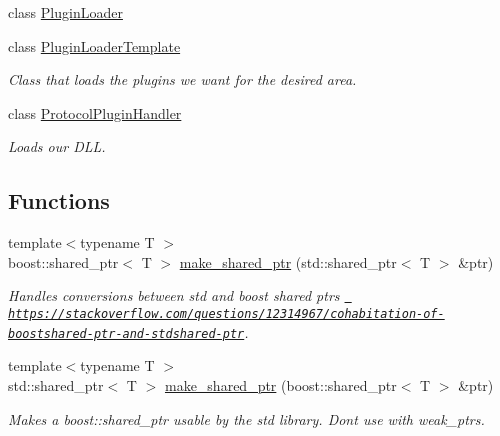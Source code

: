 \begin{DoxyCompactItemize}
class \mbox{\hyperlink{classPluginLoader_1_1PluginLoader}{Plugin\+Loader}}
\item 
class \mbox{\hyperlink{classPluginLoader_1_1PluginLoaderTemplate}{Plugin\+Loader\+Template}}
\begin{DoxyCompactList}\small\item\em Class that loads the plugins we want for the desired area. \end{DoxyCompactList}\item 
class \mbox{\hyperlink{classPluginLoader_1_1ProtocolPluginHandler}{Protocol\+Plugin\+Handler}}
\begin{DoxyCompactList}\small\item\em Loads our D\+LL. \end{DoxyCompactList}\end{DoxyCompactItemize}
\subsection*{Functions}
\textbf{ }\par
\begin{DoxyCompactItemize}
\item 
{\footnotesize template$<$typename T $>$ }\\boost\+::shared\+\_\+ptr$<$ T $>$ \mbox{\hyperlink{namespacePluginLoader_af263c44f8c785c9ca7f0a2f35c85b118}{make\+\_\+shared\+\_\+ptr}} (std\+::shared\+\_\+ptr$<$ T $>$ \&ptr)
\begin{DoxyCompactList}\small\item\em Handles conversions between std and boost shared ptrs \href{https://stackoverflow.com/questions/12314967/cohabitation-of-boostshared-ptr-and-stdshared-ptr}{\texttt{ https\+://stackoverflow.\+com/questions/12314967/cohabitation-\/of-\/boostshared-\/ptr-\/and-\/stdshared-\/ptr}}. \end{DoxyCompactList}\item 
{\footnotesize template$<$typename T $>$ }\\std\+::shared\+\_\+ptr$<$ T $>$ \mbox{\hyperlink{namespacePluginLoader_a9dba05dcd4d2e715ccb9951017354c73}{make\+\_\+shared\+\_\+ptr}} (boost\+::shared\+\_\+ptr$<$ T $>$ \&ptr)
\begin{DoxyCompactList}\small\item\em Makes a boost\+::shared\+\_\+ptr usable by the std library. Don\textquotesingle{}t use with weak\+\_\+ptr\textquotesingle{}s. \end{DoxyCompactList}\end{DoxyCompactItemize}

